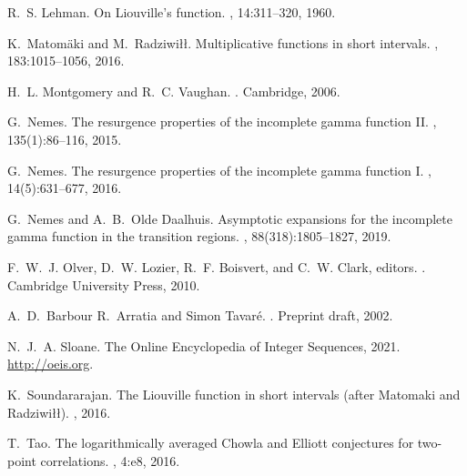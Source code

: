 \documentclass[11pt,reqno,a4letter]{article}
\numberwithin{equation}{section}
\numberwithin{figure}{section}
\numberwithin{table}{section}
\theoremstyle{plain}
\numberwithin{theorem}{section}
\theoremstyle{definition}
\begin{document}
\begin{thebibliography}{10}
R.~S. Lehman.
\newblock On {L}iouville's function.
, 14:311--320, 1960.

K.~Matom{\"{a}}ki and M.~Radziwi{\l\l}.
\newblock Multiplicative functions in short intervals.
, 183:1015--1056, 2016.

H.~L. Montgomery and R.~C. Vaughan.
.
\newblock Cambridge, 2006.

G.~Nemes.
\newblock The resurgence properties of the incomplete gamma function {II}.
, 135(1):86--116, 2015.

G.~Nemes.
\newblock The resurgence properties of the incomplete gamma function {I}.
, 14(5):631--677, 2016.

G.~Nemes and A.~B.~Olde Daalhuis.
\newblock Asymptotic expansions for the incomplete gamma function in the
  transition regions.
, 88(318):1805--1827, 2019.

F.~W.~J. Olver, D.~W. Lozier, R.~F. Boisvert, and C.~W. Clark, editors.
.
\newblock Cambridge University Press, 2010.

A.~D.~Barbour R.~Arratia and Simon Tavar{\'{e}}.
.
\newblock Preprint draft, 2002.

N.~J.~A. Sloane.
\newblock The {O}nline {E}ncyclopedia of {I}nteger {S}equences, 2021.
\newblock \url{http://oeis.org}.

K.~Soundararajan.
\newblock The {L}iouville function in short intervals (after {M}atomaki and
  {R}adziwi{\l}{\l}).
, 2016.

T.~Tao.
\newblock The logarithmically averaged {C}howla and {E}lliott conjectures for
  two-point correlations.
, 4:e8, 2016.

\end{thebibliography}

\newpage
\appendix
{}
\setcounter{section}{0} 
\renewcommand{\thesection}{\Alph{section}} 
\end{document}
